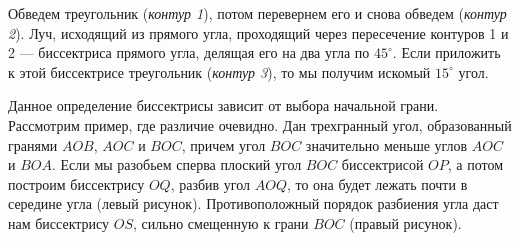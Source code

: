 ﻿
\begin{itemize}
\itA %
%
Обведем треугольник ({\itshape контур 1}), потом перевернем его и снова обведем ({\itshape контур 2}).
Луч, исходящий из прямого угла, проходящий через пересечение контуров 1 и 2 --- биссектриса прямого угла,
делящая его на два угла по $45^\circ$.
Если приложить к этой биссектрисе треугольник ({\itshape контур 3}), то мы получим искомый $15^\circ$ угол.

\begin{center}\end{center}

\itB %
%
Данное определение биссектрисы зависит от выбора начальной \linebreak грани. Рассмотрим пример,
где различие очевидно. Дан трехгранный угол, образованный гранями $AOB$, $AOC$ и $BOC$,
причем угол $BOC$ значительно меньше углов $AOC$ и $BOA$.
Если мы разобьем сперва плоский угол $BOC$ биссектрисой $OP$, а потом 
построим биссектрису $OQ$, разбив угол $AOQ$, то она будет лежать почти в середине угла (левый рисунок).
Противоположный порядок разбиения угла даст нам биссектрису $OS$, сильно смещенную к грани $BOC$ (правый рисунок).



\end{itemize}
